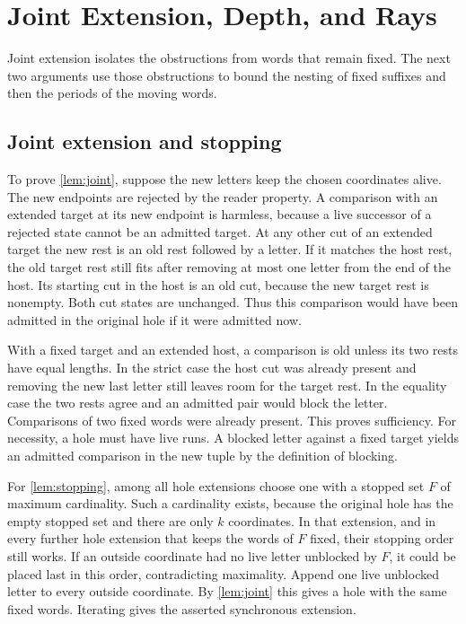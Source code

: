 \section{Joint Extension, Depth, and Rays}
\label{app:rays}

Joint extension isolates the obstructions from words that remain
fixed. The next two arguments use those obstructions to bound the
nesting of fixed suffixes and then the periods of the moving words.

\subsection{Joint extension and stopping}

To prove \cref{lem:joint}, suppose the new letters keep the chosen
coordinates alive. The new endpoints are rejected by the reader
property. A comparison with an extended target at its new endpoint
is harmless, because a live successor of a rejected state cannot
be an admitted target. At any other cut of an extended target the
new rest is an old rest followed by a letter. If it matches the
host rest, the old target rest still fits after removing at most one
letter from the end of the host. Its starting cut in the host is an
old cut, because the new target rest is nonempty. Both cut states
are unchanged. Thus this comparison would have been admitted in
the original hole if it were admitted now.

With a fixed target and an extended host, a comparison is old unless
its two rests have equal lengths. In the strict case the host cut
was already present and removing the new last letter still leaves
room for the target rest. In the equality case the two rests agree
and an admitted pair would block the letter. Comparisons of
two fixed words were already present. This proves sufficiency.
For necessity, a hole must have live runs. A blocked letter against
a fixed target yields an admitted comparison in the new tuple by
the definition of blocking.

For \cref{lem:stopping}, among all hole extensions choose one with
a stopped set $F$ of maximum cardinality. Such a cardinality exists,
because the original hole has the empty stopped set and there are
only $k$ coordinates. In that extension, and in every further hole
extension that keeps the words of $F$ fixed, their stopping order
still works. If an outside coordinate had no live letter unblocked
by $F$, it could be placed last in this order, contradicting maximality.
Append one live unblocked letter to every outside coordinate. By
\cref{lem:joint} this gives a hole with the same fixed words. Iterating
gives the asserted synchronous extension.

